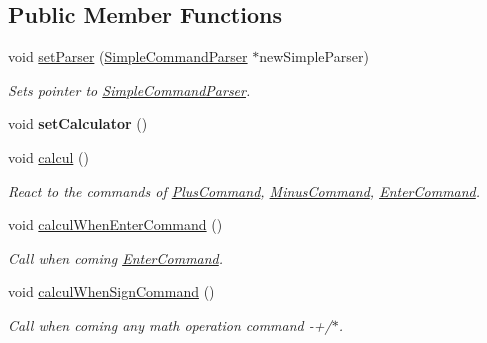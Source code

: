 \subsection*{Public Member Functions}
\begin{DoxyCompactItemize}
\item 
void \hyperlink{class_sign_simple_command_parser_state_a6211fcf5813c099ffd2bde64198b9f97}{set\+Parser} (\hyperlink{class_simple_command_parser}{Simple\+Command\+Parser} $\ast$new\+Simple\+Parser)
\begin{DoxyCompactList}\small\item\em Sets pointer to \hyperlink{class_simple_command_parser}{Simple\+Command\+Parser}. \end{DoxyCompactList}\item 
\hypertarget{class_sign_simple_command_parser_state_a6e284aaf4edf82bb5692ec2ec51cfea2}{}void {\bfseries set\+Calculator} ()\label{class_sign_simple_command_parser_state_a6e284aaf4edf82bb5692ec2ec51cfea2}

\item 
void \hyperlink{class_sign_simple_command_parser_state_a7e816080deee6dbc8e5465ce6875335f}{calcul} ()
\begin{DoxyCompactList}\small\item\em React to the commands of \hyperlink{class_plus_command}{Plus\+Command}, \hyperlink{class_minus_command}{Minus\+Command}, \hyperlink{class_enter_command}{Enter\+Command}. \end{DoxyCompactList}\item 
\hypertarget{class_sign_simple_command_parser_state_a49e3c2eb77bead42c615da4ebe5ca16b}{}void \hyperlink{class_sign_simple_command_parser_state_a49e3c2eb77bead42c615da4ebe5ca16b}{calcul\+When\+Enter\+Command} ()\label{class_sign_simple_command_parser_state_a49e3c2eb77bead42c615da4ebe5ca16b}

\begin{DoxyCompactList}\small\item\em Call when coming \hyperlink{class_enter_command}{Enter\+Command}. \end{DoxyCompactList}\item 
\hypertarget{class_sign_simple_command_parser_state_ab223212b938c64d8dbaf406684995bf8}{}void \hyperlink{class_sign_simple_command_parser_state_ab223212b938c64d8dbaf406684995bf8}{calcul\+When\+Sign\+Command} ()\label{class_sign_simple_command_parser_state_ab223212b938c64d8dbaf406684995bf8}

\begin{DoxyCompactList}\small\item\em Call when coming any math operation command -\/+/$\ast$. \end{DoxyCompactList}\end{DoxyCompactItemize}
